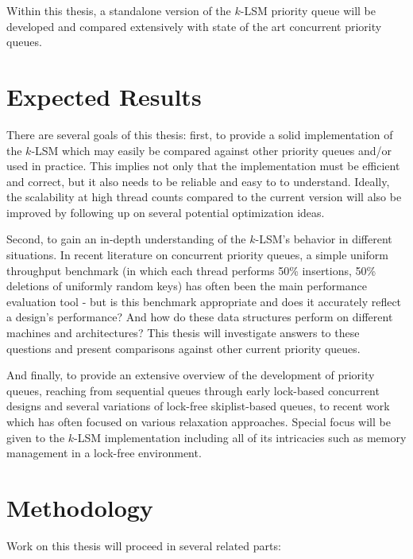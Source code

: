 \documentclass[a4paper,11pt]{article}
\begin{document}
Within this thesis, a standalone version of the $k$-LSM priority queue will be
developed and compared extensively with state of the art concurrent priority
queues.

\section{Expected Results}

There are several goals of this thesis: first, to provide a solid
implementation of the $k$-LSM which may easily be compared against other
priority queues and/or used in practice. This implies not only that the
implementation must be efficient and correct, but it also needs to be reliable
and easy to to understand. Ideally, the scalability at high thread counts
compared to the current version will also be improved by following up on
several potential optimization ideas.

Second, to gain an in-depth understanding of the $k$-LSM's behavior in
different situations. In recent literature on concurrent priority queues, a
simple uniform throughput benchmark (in which each thread performs 50\%
insertions, 50\% deletions of uniformly random keys) has often been the main
performance evaluation tool - but is this benchmark appropriate and does it
accurately reflect a design's performance? And how do these data structures
perform on different machines and architectures? This thesis will investigate
answers to these questions and present comparisons against other current
priority queues.

And finally, to provide an extensive overview of the development of priority
queues, reaching from sequential queues through early lock-based concurrent
designs and several variations of lock-free skiplist-based queues, to recent
work which has often focused on various relaxation approaches. Special focus
will be given to the $k$-LSM implementation including all of its intricacies
such as memory management in a lock-free environment.

\section{Methodology}

Work on this thesis will proceed in several related parts:
\end{document}
